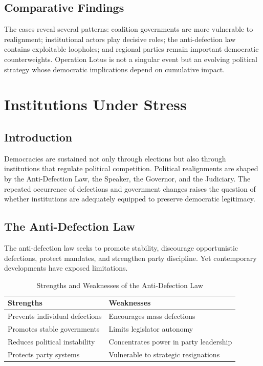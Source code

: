 \documentclass[11pt]{article}
\begin{document}
\subsection{Comparative Findings}
The cases reveal several patterns: coalition governments are more vulnerable to realignment; institutional actors play decisive roles; the anti-defection law contains exploitable loopholes; and regional parties remain important democratic counterweights. Operation Lotus is not a singular event but an evolving political strategy whose democratic implications depend on cumulative impact.

\section{Institutions Under Stress}
\subsection{Introduction}
Democracies are sustained not only through elections but also through institutions that regulate political competition. Political realignments are shaped by the Anti-Defection Law, the Speaker, the Governor, and the Judiciary. The repeated occurrence of defections and government changes raises the question of whether institutions are adequately equipped to preserve democratic legitimacy.

\subsection{The Anti-Defection Law}
The anti-defection law seeks to promote stability, discourage opportunistic defections, protect mandates, and strengthen party discipline. Yet contemporary developments have exposed limitations.

\begin{table}[h]
\centering
\caption{Strengths and Weaknesses of the Anti-Defection Law}
\begin{tabularx}{\textwidth}{XX}
\toprule
Strengths & Weaknesses\\
\midrule
Prevents individual defections & Encourages mass defections\\
Promotes stable governments & Limits legislator autonomy\\
Reduces political instability & Concentrates power in party leadership\\
Protects party systems & Vulnerable to strategic resignations\\
\bottomrule
\end{tabularx}
\end{table}
\end{document}

